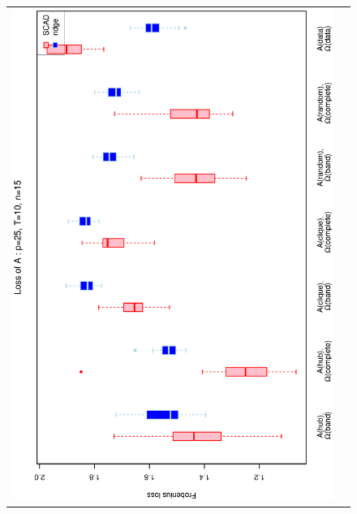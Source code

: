 \begin{figure}[h!]
\centering
\begin{tabular}{cc}
\includegraphics[scale=0.45,angle=270]{LossA25T10N15_5.eps}
\\

\end{tabular}
\end{figure}
